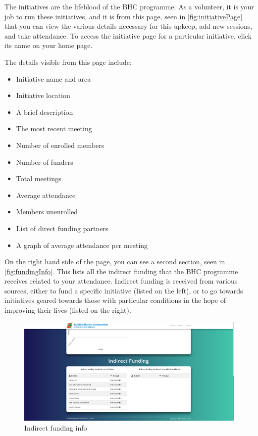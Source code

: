 \documentclass{bhcguides}
\begin{document}
The initiatives are the lifeblood of the BHC programme. As a volunteer, it is your job to run these initiatives, and it is from this page, seen in \autoref{fig:initiativePage} that you can view the various details necessary for this upkeep, add new sessions, and take attendance. To access the initiative page for a particular initiative, click its name on your home page.

The details visible from this page include:
\begin{itemize}
	\item Initiative name and area
	\item Initiative location
	\item A brief description
	\item The most recent meeting
	\item Number of enrolled members
	\item Number of funders
	\item Total meetings
	\item Average attendance
	\item Members unenrolled
	\item List of direct funding partners
	\item A graph of average attendance per meeting
\end{itemize}

On the right hand side of the page, you can see a second section, seen in \autoref{fig:fundingInfo}. This lists all the indirect funding that the BHC programme receives related to your attendance. Indirect funding is received from various sources, either to fund a specific initiative (listed on the left), or to go towards initiatives geared towards those with particular conditions in the hope of improving their lives (listed on the right).

\begin{figure}[h]
 \centerline{\includegraphics[width=\textwidth, height=\textheight, keepaspectratio]{fundinginfo.png}}
 \caption{Indirect funding info}
 \label{fig:fundingInfo}
\end{figure}
\end{document}
